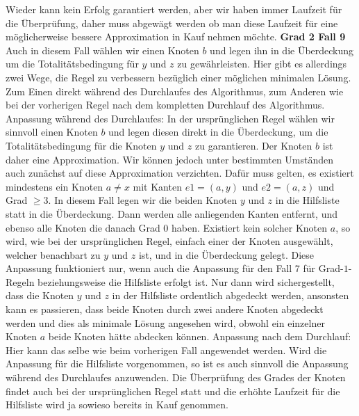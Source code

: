 \documentclass[12pt,onecolumn, notitlepage]{scrartcl}
\begin{document}
Wieder kann kein Erfolg garantiert werden, aber wir haben immer Laufzeit für die Überprüfung, daher muss abgewägt werden ob man diese Laufzeit für eine möglicherweise bessere Approximation in Kauf nehmen möchte.\newline\newline
\textbf{Grad 2 Fall 9}\newline
Auch in diesem Fall wählen wir einen Knoten $b$ und legen ihn in die Überdeckung um die Totalitätsbedingung für $y$ und $z$ zu gewährleisten. Hier gibt es allerdings zwei Wege, die Regel zu verbessern bezüglich einer möglichen minimalen Lösung. Zum Einen direkt während des Durchlaufes des Algorithmus, zum Anderen wie bei der vorherigen Regel nach dem kompletten Durchlauf des Algorithmus.\newline
Anpassung während des Durchlaufes:\newline
In der ursprünglichen Regel wählen wir sinnvoll einen Knoten $b$ und legen diesen direkt in die Überdeckung, um die Totalitätsbedingung für die Knoten $y$ und $z$ zu garantieren. Der Knoten $b$ ist daher eine Approximation. Wir können jedoch unter bestimmten Umständen auch zunächst auf diese Approximation verzichten. Dafür muss gelten, es existiert mindestens ein Knoten $a \neq x$ mit Kanten $e1 = (a,y)$ und $e2 = (a,z)$ und Grad $\geq 3$. In diesem Fall legen wir die beiden Knoten $y$ und $z$ in die Hilfsliste statt in die Überdeckung. Dann werden alle anliegenden Kanten entfernt, und ebenso alle Knoten die danach Grad $0$ haben. \newline
Existiert kein solcher Knoten $a$, so wird, wie bei der ursprünglichen Regel, einfach einer der Knoten ausgewählt, welcher benachbart zu $y$ und $z$ ist, und in die Überdeckung gelegt. 
Diese Anpassung funktioniert nur, wenn auch die Anpassung für den Fall 7 für Grad-$1$-Regeln beziehungsweise die Hilfsliste erfolgt ist. Nur dann wird sichergestellt, dass die Knoten $y$ und $z$ in der Hilfsliste ordentlich abgedeckt werden, ansonsten kann es passieren, dass beide Knoten durch zwei andere Knoten abgedeckt werden und dies als minimale Lösung angesehen wird, obwohl ein einzelner Knoten $a$ beide Knoten hätte abdecken können. \newline\newline
Anpassung nach dem Durchlauf: \newline
Hier kann das selbe wie beim vorherigen Fall angewendet werden.\newline
Wird die Anpassung für die Hilfsliste vorgenommen, so ist es auch sinnvoll die Anpassung während des Durchlaufes anzuwenden. Die Überprüfung des Grades der Knoten findet auch bei der ursprünglichen Regel statt und die erhöhte Laufzeit für die Hilfsliste wird ja sowieso bereits in Kauf genommen. 
\end{document}
